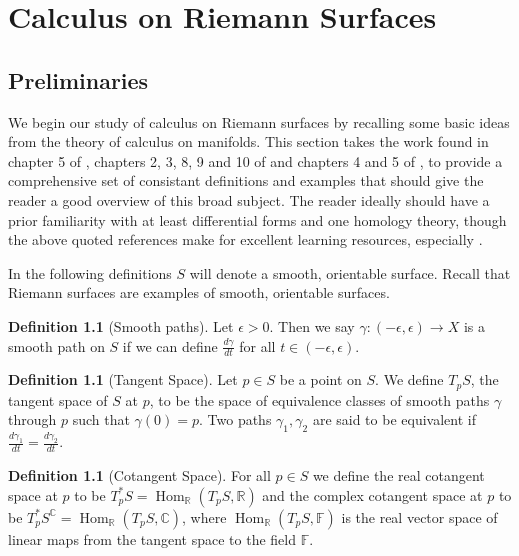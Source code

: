 \documentclass[11pt]{report}
\theoremstyle{definition}
\newtheorem{defn}[thm]{Definition}
\DeclareMathOperator{\Hom}{Hom}
\begin{document}
\newpage 
\chapter{Calculus on Riemann Surfaces}

\section{Preliminaries}
We begin our study of calculus on Riemann surfaces by recalling some basic ideas from the theory of calculus on manifolds. This section takes the work found in chapter 5 of \cite{donaldson}, chapters 2, 3, 8, 9 and 10 of \cite{calcohomo} and chapters 4 and 5 of \cite{spivak}, to provide a comprehensive set of consistant definitions and examples that should give the reader a good overview of this broad subject. The reader ideally should have a prior familiarity with at least differential forms and one homology theory, though the above quoted references make for excellent learning resources, especially \cite{calcohomo}. 

In the following definitions $S$ will denote a smooth, orientable surface. Recall that Riemann surfaces are examples of smooth, orientable surfaces. 

\begin{defn}[Smooth paths]\label{Smooth Path}
  Let $\epsilon > 0$. Then we say $\gamma:(-\epsilon,\epsilon) \rightarrow X$ is a smooth path on $S$ if we can define $\frac{d\gamma}{dt}$ for all $t \in (-\epsilon,\epsilon)$.
\end{defn}

\begin{defn}[Tangent Space]\label{TpX}
  Let $p \in S$ be a point on $S$. We define $T_pS$, the tangent space of $S$ at
  $p$, to be the space of equivalence classes of smooth paths $\gamma$ through $p$ such that $\gamma(0)=p$. Two paths $\gamma_1, \gamma_2$ are said to be
  equivalent if $\frac{d\gamma_1}{dt}=\frac{d\gamma_2}{dt}$.
\end{defn}

\begin{defn}[Cotangent Space]\label{T*pX}
  For all $p \in S$ we define the real cotangent space at $p$ to be
  $T^*_pS = \Hom_{\mathbb{R}}(T_pS, \mathbb{R})$ and the complex cotangent
  space at $p$ to be $T^*_pS^{\mathbb{C}} = \Hom_{\mathbb{R}}(T_pS,\mathbb{C})$, where $\Hom_{\mathbb{R}}(T_pS, \mathbb{F})$ is the real vector space of linear maps from the tangent space to the field $\mathbb{F}$.
\end{defn}
\end{document}
